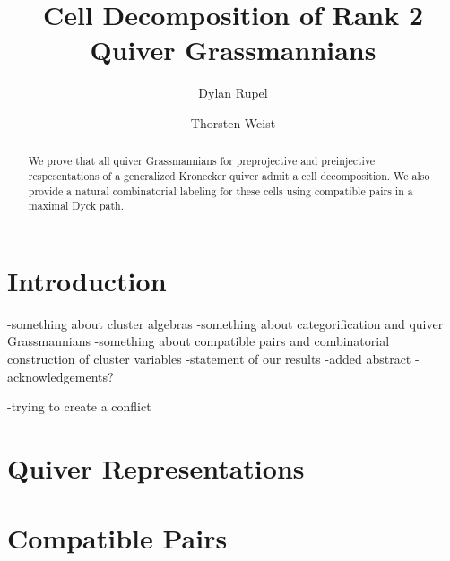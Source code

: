 \documentclass{amsart}
\author{Dylan Rupel}
\author{Thorsten Weist}
\title{Cell Decomposition of Rank 2 Quiver Grassmannians}
\begin{document}
\begin{abstract}
  We prove that all quiver Grassmannians for preprojective and preinjective respesentations of a generalized Kronecker quiver admit a cell decomposition.  
  We also provide a natural combinatorial labeling for these cells using compatible pairs in a maximal Dyck path. 
\end{abstract}
\maketitle

\section{Introduction}
-something about cluster algebras
-something about categorification and quiver Grassmannians
-something about compatible pairs and combinatorial construction of cluster variables
-statement of our results
-added abstract
-acknowledgements?

-trying to create a conflict
\section{Quiver Representations}

\section{Compatible Pairs}
\end{document}
